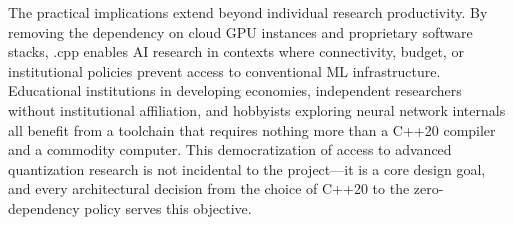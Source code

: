 The practical implications extend beyond individual research productivity. By removing the dependency on cloud GPU instances and proprietary software stacks, \MYTHOS{}.cpp enables AI research in contexts where connectivity, budget, or institutional policies prevent access to conventional ML infrastructure. Educational institutions in developing economies, independent researchers without institutional affiliation, and hobbyists exploring neural network internals all benefit from a toolchain that requires nothing more than a C++20 compiler and a commodity computer. This democratization of access to advanced quantization research is not incidental to the project---it is a core design goal, and every architectural decision from the choice of C++20 to the zero-dependency policy serves this objective.

